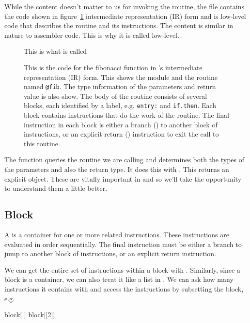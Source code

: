 While the content doesn't matter to us for invoking the routine, the
 file contains the code shown in figure~\ref{fig:IRCodeDisplay}
intermediate representation (IR) form and is low-level code that
describes the routine and its instructions.  The content is similar in
nature to assembler code. This is why it is called low-level.
\begin{figure}
 This is what is called  
  \caption{This is the code for the fibonacci function
in \llvm's intermediate representation (IR) form.
This shows the module and the routine named \texttt{@fib}.
The type information of the parameters and return value is also show.
The body of the routine consists of several blocks, each identified
by a label, e.g. \texttt{entry:} and \texttt{if.then}.
Each block contains instructions that do the work of the routine.
The final instruction in each block is either a branch ()
to another block of instructions, or an explicit return ()
instruction to exit the call to this routine.
}\label{fig:IRCodeDisplay}
\end{figure}

The  function queries the routine we are calling and
determines both the types of the parameters and also the return type.
It does this with .  This returns an explicit
 object. These are vitally important in \llvm{} and
so we'll take the opportunity to understand them a little better.





\subsection{Block}
A  is a container for one or more related instructions.
These instructions are evaluated in order sequentially.  The final
instruction must be either a branch to jump to another block of
instructions, or an explicit return instruction.

We can get the entire set of instructions within  a block
with .
Similarly, since a block is a container, we can also treat it like a list in \R.  We
can ask how many instructions it contains with  and
access the instructions by subsetting the block, e.g.
\begin{RCode}
 block[ ]  
 block[[2]]
\end{RCode}

